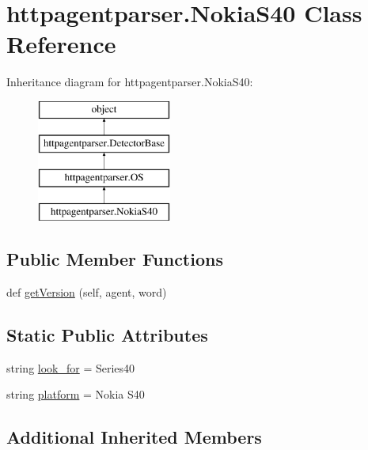 \hypertarget{classhttpagentparser_1_1_nokia_s40}{}\section{httpagentparser.\+Nokia\+S40 Class Reference}
\label{classhttpagentparser_1_1_nokia_s40}
Inheritance diagram for httpagentparser.\+Nokia\+S40\+:\begin{figure}[H]
\begin{center}
\leavevmode
\includegraphics[height=4.000000cm]{classhttpagentparser_1_1_nokia_s40}
\end{center}
\end{figure}
\subsection*{Public Member Functions}
\begin{DoxyCompactItemize}
\item 
def \hyperlink{classhttpagentparser_1_1_nokia_s40_a8c83ff3389c2315e40808c997c66de57}{get\+Version} (self, agent, word)
\end{DoxyCompactItemize}
\subsection*{Static Public Attributes}
\begin{DoxyCompactItemize}
\item 
string \hyperlink{classhttpagentparser_1_1_nokia_s40_a1634490af5c8930688d2c242ea680fd3}{look\+\_\+for} = \textquotesingle{}Series40\textquotesingle{}
\item 
string \hyperlink{classhttpagentparser_1_1_nokia_s40_ab10396e0902466c67b1888a9411819de}{platform} = \textquotesingle{}Nokia S40\textquotesingle{}
\end{DoxyCompactItemize}
\subsection*{Additional Inherited Members}


